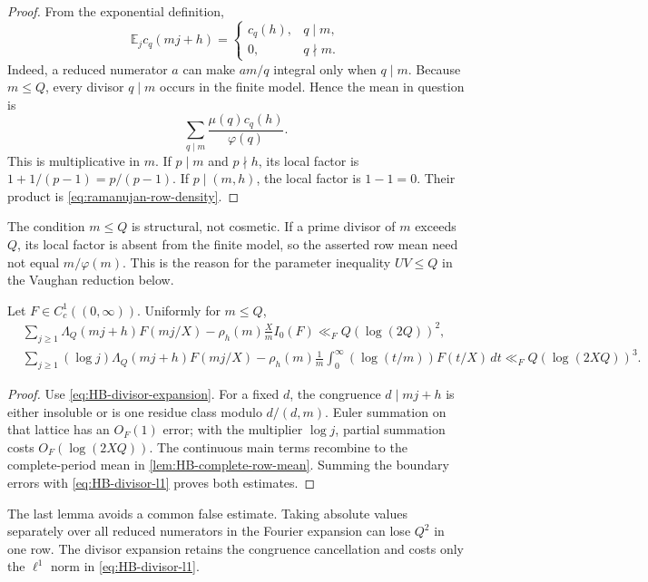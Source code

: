 \begin{proof}
From the exponential definition,
\begin{equation}
 \mathbb E_j c_q(mj+h)=
 \begin{cases}
 c_q(h),&q\mid m,\\
 0,&q\nmid m.
 \end{cases}
 \label{eq:ramanujan-row-average}
\end{equation}
Indeed, a reduced numerator $a$ can make $am/q$ integral only when
$q\mid m$.  Because $m\leq Q$, every divisor $q\mid m$ occurs in the
finite model.  Hence the mean in question is
\[
 \sum_{q\mid m}\frac{\mu(q)c_q(h)}{\varphi(q)}.
\]
This is multiplicative in $m$.  If $p\mid m$ and $p\nmid h$, its local
factor is $1+1/(p-1)=p/(p-1)$.  If $p\mid(m,h)$, the local factor is
$1-1=0$.  Their product is \eqref{eq:ramanujan-row-density}.
\end{proof}

The condition $m\leq Q$ is structural, not cosmetic.  If a prime divisor
of $m$ exceeds $Q$, its local factor is absent from the finite model, so
the asserted row mean need not equal $m/\varphi(m)$.  This is the reason
for the parameter inequality $UV\leq Q$ in the Vaughan reduction below.

\begin{lemma}
\label{lem:HB-incomplete-row-error}
Let $F\in C_c^1((0,\infty))$.  Uniformly for $m\leq Q$,
\begin{align}
 &\sum_{j\geq1}\Lambda_Q(mj+h)F(mj/X)
 -\rho_h(m)\frac Xm I_0(F)
 \ll_F Q(\log(2Q))^2,
 \label{eq:HB-row-lattice-error}\\
 &\sum_{j\geq1}(\log j)\Lambda_Q(mj+h)F(mj/X)
 -\rho_h(m)\frac1m
 \int_0^\infty(\log(t/m))F(t/X)\,dt
 \ll_F Q(\log(2XQ))^3.
 \label{eq:HB-log-row-lattice-error}
\end{align}
\end{lemma}

\begin{proof}
Use \eqref{eq:HB-divisor-expansion}.  For a fixed $d$, the congruence
$d\mid mj+h$ is either insoluble or is one residue class modulo
$d/(d,m)$.  Euler summation on that lattice has an $O_F(1)$ error; with
the multiplier $\log j$, partial summation costs $O_F(\log(2XQ))$.
The continuous main terms recombine to the complete-period mean in
\cref{lem:HB-complete-row-mean}.  Summing the boundary errors with
\eqref{eq:HB-divisor-l1} proves both estimates.
\end{proof}

The last lemma avoids a common false estimate.  Taking absolute values
separately over all reduced numerators in the Fourier expansion can lose
$Q^2$ in one row.  The divisor expansion retains the congruence
cancellation and costs only the $\ell^1$ norm in
\eqref{eq:HB-divisor-l1}.
